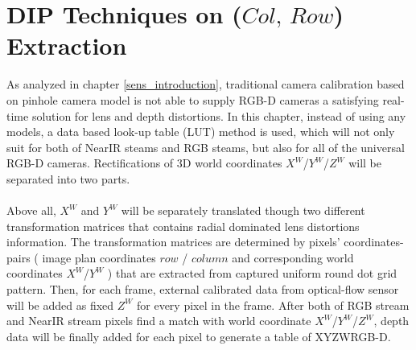\section{DIP Techniques on (\(Col,\, Row\)) Extraction}
\label{sectionDIPTechniques}



\noindent
As analyzed in chapter \ref{sens_introduction}, traditional camera calibration based on pinhole camera model is not able to supply RGB-D cameras a satisfying real-time solution for lens and depth distortions. In this chapter, instead of using any models, a data based look-up table (LUT) method is used, which will not only suit for both of NearIR steams and RGB steams, but also for all of the universal RGB-D cameras. Rectifications of 3D world coordinates \(X^{W}\)/\(Y^{W}\)/\(Z^{W}\) will be separated into two parts. 
\\\\%
Above all, \(X^{W}\) and \(Y^{W}\) will be separately translated though two different transformation matrices that contains radial dominated lens distortions information. The transformation matrices are determined by pixels' coordinates-pairs ( image plan coordinates \(row\) / \(column\) and corresponding world coordinates \(X^{W}\)/\(Y^{W}\) ) that are extracted from captured uniform round dot grid pattern. Then, for each frame, external calibrated data from optical-flow sensor will be added as fixed \(Z^{W}\) for every pixel in the frame. After both of RGB stream and NearIR stream pixels find a match with world coordinate \(X^{W}\)/\(Y^{W}\)/\(Z^{W}\), depth data will be finally added for each pixel to generate a table of XYZWRGB-D.

